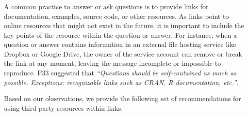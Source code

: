 \subsubsection{\recd}

    A common practice to answer or ask questions is to provide links for documentation, examples, source code, or other resources.
    As links point to online resources that might not exist in the future, it is important to include the key points of the resource within the question or answer.
    For instance, when a question or answer contains information in an external file hosting service like Dropbox or Google Drive, the owner of the service account can remove or break the link at any moment, leaving the message incomplete or impossible to reproduce. %
    P33 suggested that \textit{``Questions should be self-contained as much as possible. Exceptions: recognizable links such as CRAN, R documentation, etc.''}.

    Based on our observations, we provide the following set of recommendations for using third-party resources within links.

